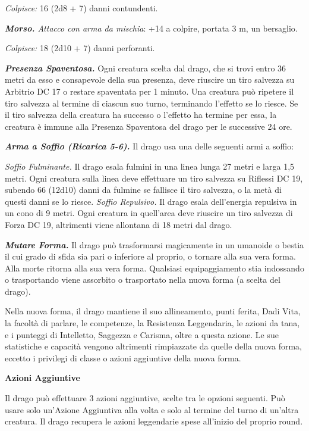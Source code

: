 \begin{multicols}{2}
\emph{Colpisce:} 16 (2d8 + 7) danni contundenti.

\emph{\textbf{Morso.} Attacco con arma da mischia}: +14 a colpire,
portata 3 m, un bersaglio.

\emph{Colpisce:} 18 (2d10 + 7) danni perforanti.

\emph{\textbf{Presenza Spaventosa.}} Ogni creatura scelta dal drago, che
si trovi entro 36 metri da esso e consapevole della sua presenza, deve
riuscire un tiro salvezza su Arbitrio DC 17 o restare spaventata per 1
minuto. Una creatura può ripetere il tiro salvezza al termine di ciascun
suo turno, terminando l'effetto se lo riesce. Se il tiro salvezza della
creatura ha successo o l'effetto ha termine per essa, la creatura è
immune alla Presenza Spaventosa del drago per le successive 24 ore.

\emph{\textbf{Arma a Soffio (Ricarica 5-6).}} Il drago usa una delle
seguenti armi a soffio:

\emph{Soffio Fulminante.} Il drago esala fulmini in una linea lunga 27
metri e larga 1,5 metri. Ogni creatura sulla linea deve effettuare un
tiro salvezza su Riflessi DC 19, subendo 66 (12d10) danni da fulmine se
fallisce il tiro salvezza, o la metà di questi danni se lo riesce.
\emph{Soffio Repulsivo.} Il drago esala dell'energia repulsiva in un
cono di 9 metri. Ogni creatura in quell'area deve riuscire un tiro
salvezza di Forza DC 19, altrimenti viene allontana di 18 metri dal
drago.

\emph{\textbf{Mutare Forma.}} Il drago può trasformarsi magicamente in
un umanoide o bestia il cui grado di sfida sia pari o inferiore al
proprio, o tornare alla sua vera forma. Alla morte ritorna alla sua vera
forma. Qualsiasi equipaggiamento stia indossando o trasportando viene
assorbito o trasportato nella nuova forma (a scelta del drago).

Nella nuova forma, il drago mantiene il suo allineamento, punti ferita,
Dadi Vita, la facoltà di parlare, le competenze, la Resistenza
Leggendaria, le azioni da tana, e i punteggi di Intelletto, Saggezza e
Carisma, oltre a questa azione. Le sue statistiche e capacità vengono
altrimenti rimpiazzate da quelle della nuova forma, eccetto i privilegi
di classe o azioni aggiuntive della nuova forma.

\textbf{Azioni Aggiuntive}

Il drago può effettuare 3 azioni aggiuntive, scelte tra le opzioni
seguenti. Può usare solo un'Azione Aggiuntiva alla volta e solo al
termine del turno di un'altra creatura. Il drago recupera le azioni
leggendarie spese all'inizio del proprio round.


\end{multicols}
